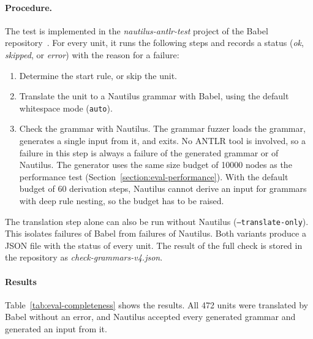 \documentclass[thesis]{plai}
\begin{document}
\paragraph{Procedure.}
The test is implemented in the \emph{nautilus-antlr-test} project of the Babel repository~\cite{babel-github}. For every unit, it runs the following steps and records a status (\emph{ok}, \emph{skipped}, or \emph{error}) with the reason for a failure:
\begin{enumerate}
    \item Determine the start rule, or skip the unit.
    \item Translate the unit to a Nautilus grammar with Babel, using the default whitespace mode (\texttt{auto}).
    \item Check the grammar with Nautilus. The grammar fuzzer loads the grammar, generates a single input from it, and exits. No ANTLR tool is involved, so a failure in this step is always a failure of the generated grammar or of Nautilus. The generator uses the same size budget of 10000 nodes as the performance test (Section~\ref{section:eval-performance}). With the default budget of 60 derivation steps, Nautilus cannot derive an input for grammars with deep rule nesting, so the budget has to be raised.
\end{enumerate}
The translation step alone can also be run without Nautilus (\texttt{--translate-only}). This isolates failures of Babel from failures of Nautilus. Both variants produce a JSON file with the status of every unit. The result of the full check is stored in the repository as \emph{check-grammars-v4.json}.

\paragraph{Results}
\label{subsection:eval-completeness-results}
Table~\ref{tab:eval-completeness} shows the results. All 472 units were translated by Babel without an error, and Nautilus accepted every generated grammar and generated an input from it.
\end{document}
